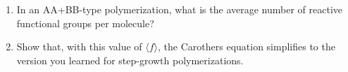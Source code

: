\begin{activity}
\begin{exercises}
		\begin{enumerate}
			\item In an AA+BB-type polymerization, what is the average number of reactive functional groups per molecule?
			
				\begin{solution}\end{solution}
			
			\item Show that, with this value of $\langle f\rangle$, the Carothers equation simplifies to the version you learned for step-growth polymerizations.
			
				\begin{solution}\end{solution}
		\end{enumerate}	
	
\end{exercises}


%
%	


	
\end{activity}